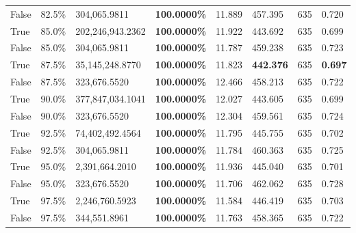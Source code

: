 \begin{table}[H]
\begin{tabular}{lllrllll}
\cline{1-8}
False & 82.5\% & 304,065.9811 & \bfseries \color{red} 100.0000\% & 11.889 & 457.395 & 635 & 0.720 \\
\cline{1-8}
True & 85.0\% & 202,246,943.2362 & \bfseries \color{red} 100.0000\% & 11.922 & 443.692 & 635 & 0.699 \\
\cline{1-8}
False & 85.0\% & 304,065.9811 & \bfseries \color{red} 100.0000\% & 11.787 & 459.238 & 635 & 0.723 \\
\cline{1-8}
True & 87.5\% & 35,145,248.8770 & \bfseries \color{red} 100.0000\% & 11.823 & \bfseries \color{red} 442.376 & 635 & \bfseries \color{red} 0.697 \\
\cline{1-8}
False & 87.5\% & 323,676.5520 & \bfseries \color{red} 100.0000\% & 12.466 & 458.213 & 635 & 0.722 \\
\cline{1-8}
True & 90.0\% & 377,847,034.1041 & \bfseries \color{red} 100.0000\% & 12.027 & 443.605 & 635 & 0.699 \\
\cline{1-8}
False & 90.0\% & 323,676.5520 & \bfseries \color{red} 100.0000\% & 12.304 & 459.561 & 635 & 0.724 \\
\cline{1-8}
True & 92.5\% & 74,402,492.4564 & \bfseries \color{red} 100.0000\% & 11.795 & 445.755 & 635 & 0.702 \\
\cline{1-8}
False & 92.5\% & 304,065.9811 & \bfseries \color{red} 100.0000\% & 11.784 & 460.363 & 635 & 0.725 \\
\cline{1-8}
True & 95.0\% & 2,391,664.2010 & \bfseries \color{red} 100.0000\% & 11.936 & 445.040 & 635 & 0.701 \\
\cline{1-8}
False & 95.0\% & 323,676.5520 & \bfseries \color{red} 100.0000\% & 11.706 & 462.062 & 635 & 0.728 \\
\cline{1-8}
True & 97.5\% & 2,246,760.5923 & \bfseries \color{red} 100.0000\% & 11.584 & 446.419 & 635 & 0.703 \\
\cline{1-8}
False & 97.5\% & 344,551.8961 & \bfseries \color{red} 100.0000\% & 11.763 & 458.365 & 635 & 0.722 \\
\cline{1-8}
\bottomrule
\end{tabular}
\end{table}

